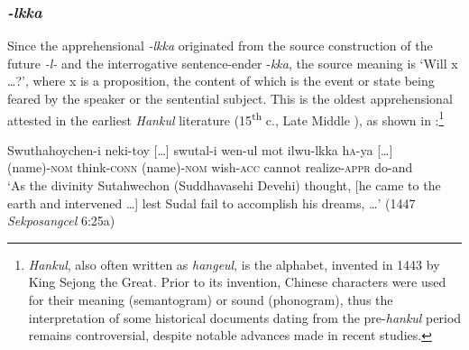 \documentclass[output=paper,colorlinks,citecolor=brown]{langscibook}
\begin{document}
\subsubsection{\textit{-lkka}} 
Since the apprehensional \textit{-lkka} originated from the source construction of the future \textit{{}-l-} and the interrogative sentence-ender \nobreakdash-\textit{kka}, the source meaning is `Will x …?', where x is a proposition, the content of which is the event or state being feared by the speaker or the sentential subject. This is the oldest apprehensional attested in the earliest \textit{Hankul} literature (15\textsuperscript{th} c., Late Middle ), as shown in :\footnote{\textit{Hankul}, also often written as \textit{hangeul}, is the  alphabet, invented in 1443 by King Sejong the Great. Prior to its invention, Chinese characters were used for their meaning (semantogram) or sound (phonogram), thus the interpretation of some historical documents dating from the pre-\textit{hankul} period remains controversial, despite notable advances made in recent studies.}


\ea \label{ex:RK4}
\gll Swuthahoychen-i neki-toy \textup{[…]} swutal-i wen-ul mot ilwu-lkka h\textsc{a}-ya \textup{[…]} \\
(name)-\textsc{nom} think-\textsc{conn} {} (name)-\textsc{nom} wish-\textsc{acc} cannot realize-\textsc{appr} do-and \\
\glt `As the divinity Sutahwechon (Suddhavasehi Devehi) thought, [he came to the earth and intervened …] lest Sudal fail to accomplish his dreams,  …' (1447 \textit{Sekposangcel} 6:25a) \\
\z
\end{document}

